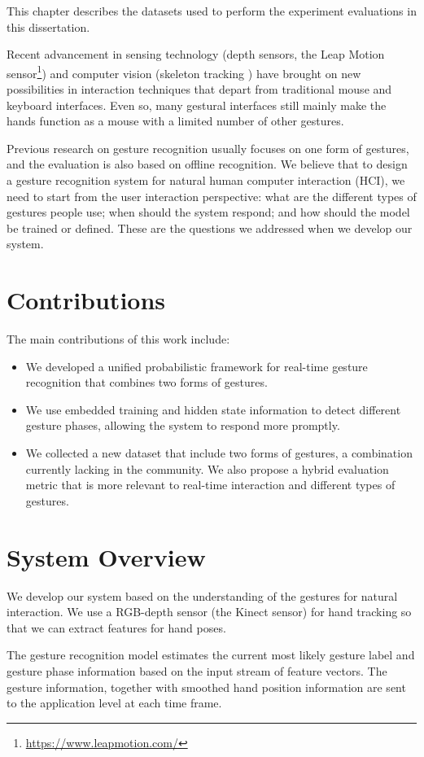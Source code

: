This chapter describes the datasets used to perform the experiment evaluations
in this dissertation.

Recent advancement in sensing technology (depth sensors, the Leap Motion
sensor\footnote{\url{https://www.leapmotion.com/}}) and computer vision
(skeleton tracking \cite{shotton13}) have brought on new possibilities in interaction techniques that depart from traditional mouse
and keyboard interfaces. Even so, many gestural
interfaces still mainly make the hands function as a mouse
with a limited number of other gestures. 

Previous research on gesture
recognition usually focuses on one form of gestures, and the evaluation is also
based on offline recognition. We believe that to design a gesture
recognition system for natural human computer interaction (HCI), we need to
start from the user interaction perspective:
what are the different types of gestures people use;
when should the system respond; and how should the model be trained or defined.
These are the questions we addressed when we develop our system.

\section{Contributions}
The main contributions of this work include:
\begin{itemize}
  \item We developed a unified probabilistic framework for real-time gesture
  recognition that combines two forms of gestures.
  \item We use embedded training and hidden state information to detect
  different gesture phases, allowing the system to respond more promptly.
  \item We collected a new dataset that include two forms of gestures, a
  combination currently lacking in the community. We also propose a hybrid
  evaluation metric that is more relevant to real-time interaction and different
  types of gestures.
\end{itemize}

\section{System Overview}
We develop our system based on the understanding of the gestures for
natural interaction. 
We use a RGB-depth sensor (the Kinect sensor) for hand tracking so that we can extract
features for hand poses.

The gesture recognition model estimates the current most likely gesture label
and gesture phase information based on the input stream of
feature vectors. The gesture information, 
together with smoothed hand position information are sent to the application level at each time frame.

